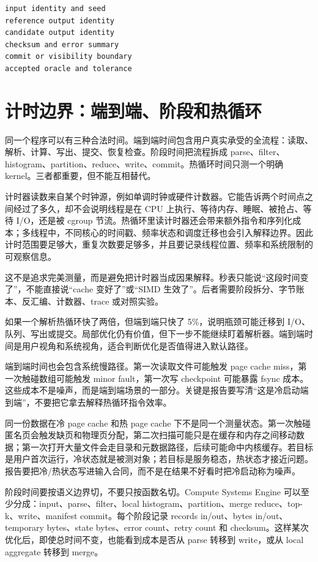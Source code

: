 \begin{lstlisting}[numbers=none,caption={一次运行至少要固定的语义状态}]
input identity and seed
reference output identity
candidate output identity
checksum and error summary
commit or visibility boundary
accepted oracle and tolerance
\end{lstlisting}

\section{计时边界：端到端、阶段和热循环}

同一个程序可以有三种合法时间。端到端时间包含用户真实承受的全流程：读取、解析、计算、写出、提交、恢复检查。阶段时间把流程拆成 parse、filter、histogram、partition、reduce、write、commit。热循环时间只测一个明确 kernel。三者都重要，但不能互相替代。

计时器读数来自某个时钟源，例如单调时钟或硬件计数器。它能告诉两个时间点之间经过了多久，却不会说明线程是在 CPU 上执行、等待内存、睡眠、被抢占、等待 I/O，还是被 cgroup 节流。热循环里读计时器还会带来额外指令和序列化成本；多线程中，不同核心的时间戳、频率状态和调度迁移也会引入解释边界。因此计时范围要足够大，重复次数要足够多，并且要记录线程位置、频率和系统限制的可观察信息。

这不是追求完美测量，而是避免把计时器当成因果解释。秒表只能说“这段时间变了”，不能直接说“cache 变好了”或“SIMD 生效了”。后者需要阶段拆分、字节账本、反汇编、计数器、trace 或对照实验。

如果一个解析热循环快了两倍，但端到端只快了 5\%，说明瓶颈可能迁移到 I/O、队列、写出或提交。局部优化仍有价值，但下一步不能继续盯着解析器。端到端时间是用户视角和系统视角，适合判断优化是否值得进入默认路径。

端到端时间也会包含系统慢路径。第一次读取文件可能触发 page cache miss，第一次触碰数组可能触发 minor fault，第一次写 checkpoint 可能暴露 fsync 成本。这些成本不是噪声，而是端到端场景的一部分。关键是报告要写清“这是冷启动端到端”，不要把它拿去解释热循环指令效率。

同一份数据在冷 page cache 和热 page cache 下不是同一个测量状态。第一次触碰匿名页会触发缺页和物理页分配，第二次扫描可能只是在缓存和内存之间移动数据；第一次打开大量文件会走目录和元数据路径，后续可能命中内核缓存。若目标是用户首次运行，冷状态就是被测对象；若目标是服务稳态，热状态才接近问题。报告要把冷/热状态写进输入合同，而不是在结果不好看时把冷启动称为噪声。

阶段时间要按语义边界切，不要只按函数名切。Compute Systems Engine 可以至少分成：input、parse、filter、local histogram、partition、merge reduce、top-k、write、manifest commit。每个阶段记录 records in/out、bytes in/out、temporary bytes、state bytes、error count、retry count 和 checksum。这样某次优化后，即使总时间不变，也能看到成本是否从 parse 转移到 write，或从 local aggregate 转移到 merge。

